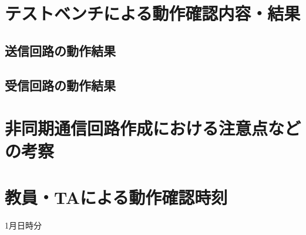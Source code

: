 \documentclass[dvipdfmx]{jarticle}
\begin{document}
\section{テストベンチによる動作確認内容・結果}
\subsection{送信回路の動作結果}
\subsection{受信回路の動作結果}
\section{非同期通信回路作成における注意点などの考察}
\section{教員・TAによる動作確認時刻}
1月日時分
\end{document}
